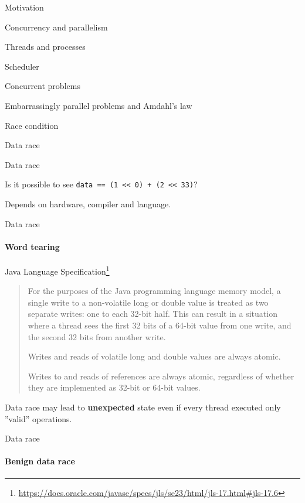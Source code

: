 \begin{section}{Motivation}
\begin{section}{Concurrency and parallelism}
\begin{section}{Threads and processes}
\begin{section}{Scheduler}
\begin{section}{Concurrent problems}
\begin{subsection}{Embarrassingly parallel problems and Amdahl's law}
\begin{subsection}{Race condition}
\begin{subsection}{Data race}
\begin{frame}[fragile]{Data race}
\pause

Is it possible to see \texttt{data == (1 << 0) + (2 << 33)}?

\pause
Depends on hardware, compiler and language. 

\end{frame}

\begin{frame}[fragile]{Data race}
\framesubtitle{Word tearing}

Java Language Specification\footnote{\url{https://docs.oracle.com/javase/specs/jls/se23/html/jls-17.html#jls-17.6}}

\begin{quote}
For the purposes of the Java programming language memory model, a single write to a non-volatile long or double value is treated as two separate writes: one to each 32-bit half. This can result in a situation where a thread sees the first 32 bits of a 64-bit value from one write, and the second 32 bits from another write.

Writes and reads of volatile long and double values are always atomic.

Writes to and reads of references are always atomic, regardless of whether they are implemented as 32-bit or 64-bit values.
\end{quote}

\pause

Data race may lead to \textbf{unexpected} state even if every thread executed only ''valid'' operations.
\end{frame}


\begin{frame}{Data race}
\framesubtitle{Benign data race}

%
%
%
%
%
%
%


\end{frame}
\end{subsection}
\end{subsection}
\end{subsection}
\end{section}
\end{section}
\end{section}
\end{section}
\end{section}

